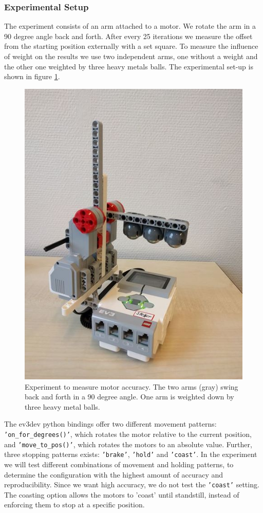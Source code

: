 \documentclass[11pt, a4paper]{article}
\begin{document}
\subsubsection*{Experimental Setup}
The experiment consists of an arm attached to a motor. We rotate the arm in a 90 degree angle back and forth. After every 25 iterations we measure the offset from the starting position externally with a set square. To measure the influence of weight on the results we use two independent arms, one without a weight and the other one weighted by three heavy metals balls. The experimental set-up is shown in figure \ref{fig:angle_experiment}.

\begin{figure}
\centering
\includegraphics[width=0.35\linewidth]{images/angle_experiment}
\caption{Experiment to measure motor accuracy. The two arms (gray) swing back and forth in a 90 degree angle. One arm is weighted down by three heavy metal balls.}
\label{fig:angle_experiment}
\end{figure}



The ev3dev python bindings offer two different movement patterns: \texttt{'on\_for\_degrees()'}, which rotates the motor relative to the current position, and \texttt{'move\_to\_pos()'}, which rotates the motors to an absolute value.  Further, three stopping patterns exists: \texttt{'brake'}, \texttt{'hold'} and \texttt{'coast'}. In the experiment we will test different combinations of movement and holding patterns, to determine the configuration with the highest amount of accuracy and reproducibility. Since we want high accuracy, we do not test the \texttt{'coast'} setting. The coasting option allows the motors to 'coast' until standstill, instead of enforcing them to stop at a specific position. 
\end{document}

